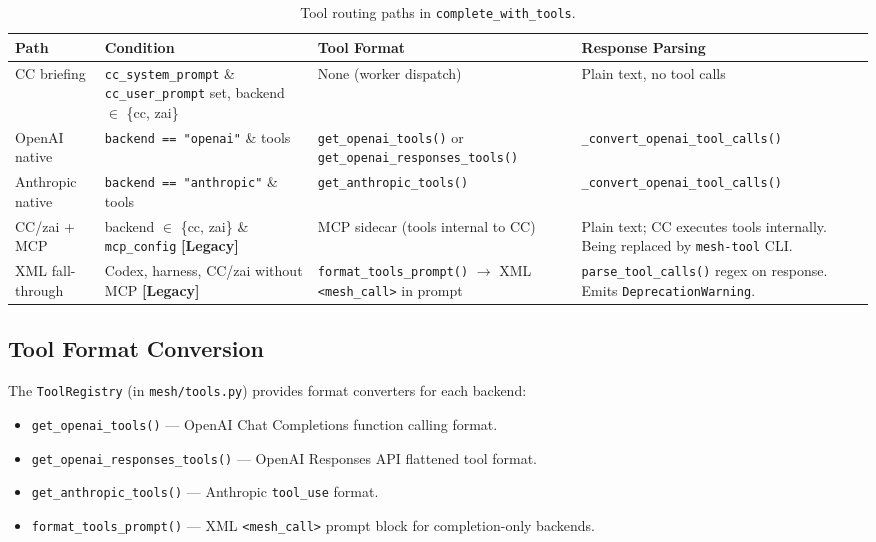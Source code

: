 \documentclass[11pt,a4paper]{article}
\newcommand{\code}[1]{\texttt{#1}}
\begin{document}
\begin{table}[h]
\centering
\small
\begin{tabular}{@{}lL{3cm}L{3.5cm}L{3.5cm}@{}}
\toprule
\textbf{Path} & \textbf{Condition} & \textbf{Tool Format} & \textbf{Response Parsing} \\
\midrule
CC briefing
  & \code{cc\_system\_prompt} \& \code{cc\_user\_prompt} set,
    backend $\in$ \{cc, zai\}
  & None (worker dispatch)
  & Plain text, no tool calls \\
\addlinespace
OpenAI native
  & \code{backend == "openai"} \& tools
  & \code{get\_openai\_tools()} or \code{get\_openai\_responses\_tools()}
  & \code{\_convert\_openai\_tool\_calls()} \\
\addlinespace
Anthropic native
  & \code{backend == "anthropic"} \& tools
  & \code{get\_anthropic\_tools()}
  & \code{\_convert\_openai\_tool\_calls()} \\
\addlinespace
CC/zai + MCP
  & backend $\in$ \{cc, zai\} \& \code{mcp\_config}
    \textbf{[Legacy]}
  & MCP sidecar (tools internal to CC)
  & Plain text; CC executes tools internally.
    Being replaced by \code{mesh-tool} CLI. \\
\addlinespace
XML fall-through
  & Codex, harness, CC/zai without MCP
    \textbf{[Legacy]}
  & \code{format\_tools\_prompt()} $\to$ XML \code{<mesh\_call>} in prompt
  & \code{parse\_tool\_calls()} regex on response.
    Emits \code{DeprecationWarning}. \\
\bottomrule
\end{tabular}
\caption{Tool routing paths in \code{complete\_with\_tools}.}
\label{tab:dispatch}
\end{table}

\subsection{Tool Format Conversion}

The \code{ToolRegistry} (in \code{mesh/tools.py}) provides format
converters for each backend:

\begin{itemize}[nosep]
  \item \code{get\_openai\_tools()} --- OpenAI Chat Completions
        function calling format.
  \item \code{get\_openai\_responses\_tools()} --- OpenAI Responses API
        flattened tool format.
  \item \code{get\_anthropic\_tools()} --- Anthropic \code{tool\_use}
        format.
  \item \code{format\_tools\_prompt()} --- XML
        \code{<mesh\_call>} prompt block for completion-only backends.
\end{itemize}
\end{document}
